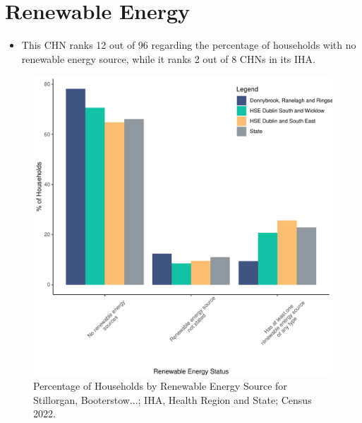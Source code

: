\documentclass{article}
\begin{document}
\section{Renewable Energy}\label{sect:RE}
\begin{itemize}
\item This CHN ranks  12 out of 96 regarding the percentage of households with no renewable energy source, while it ranks   2 out of 8 CHNs in its IHA.
\end{itemize}
\begin{figure}[H]
	\centering
	\includegraphics[width = 140mm]{../figures/RenewableEnergyED.pdf}
	\caption{Percentage of Households by Renewable Energy Source for Stillorgan, Booterstow...; IHA, Health Region and State; Census 2022.}
	\label{fig:vbnv}
	\end{figure}
\end{document}
